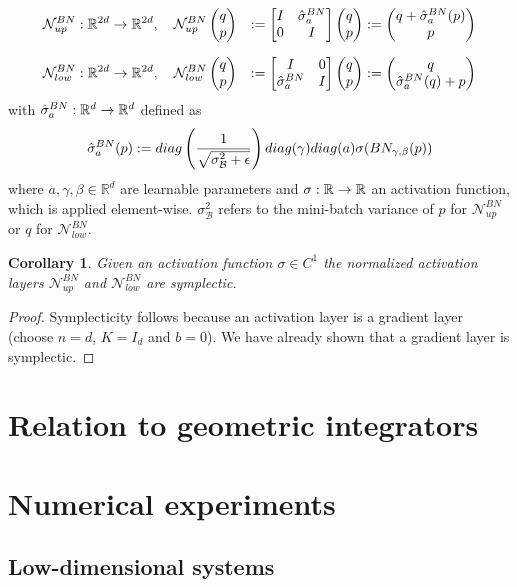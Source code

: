 \documentclass[twoside,a4paper]{article}
\newtheorem{corollary}{Corollary}
\begin{document}
\begin{alignat*}{2}
	\mathcal{N}^{BN}_{up} &: \mathbb{R}^{2d} \to \mathbb{R}^{2d}, \quad
	\mathcal{N}^{BN}_{up} \begin{pmatrix} q \\ p \end{pmatrix} &:= \begin{bmatrix} I & {\hat{\sigma}^{BN}_a} \\ 0 & I \end{bmatrix} \begin{pmatrix} q \\ p \end{pmatrix} := \begin{pmatrix}
		q + \hat{\sigma}^{BN}_a(p) \\
		p
	\end{pmatrix} \\[7pt]
	\mathcal{N}^{BN}_{low} &: \mathbb{R}^{2d} \to \mathbb{R}^{2d}, \quad
	\mathcal{N}^{BN}_{low} \begin{pmatrix} q \\ p \end{pmatrix} &:= \begin{bmatrix} I & 0 \\ {\hat{\sigma}^{BN}_a} & I \end{bmatrix} \begin{pmatrix} q \\ p \end{pmatrix} := \begin{pmatrix}
		q \\
		\hat{\sigma}^{BN}_a(q) + p
	\end{pmatrix}
\end{alignat*}
with $\hat{\sigma}^{BN}_a : \mathbb{R}^d \to \mathbb{R}^d$ defined as
\begin{equation*}
	\hat{\sigma}^{BN}_a(p) := 
	diag\left( \frac{1}{\sqrt{\sigma^2_\mathcal{B} + \epsilon}} \right) diag(\gamma)
	diag(a) \sigma(BN_{\gamma, \beta}(p))
\end{equation*}
where $a, \gamma, \beta \in \mathbb{R}^d$ are learnable parameters and 
$\sigma : \mathbb{R} \to \mathbb{R}$ an activation function,
which is applied element-wise. $\sigma^2_\mathcal{B}$ refers to the mini-batch variance of $p$
for $\mathcal{N}^{BN}_{up}$ or $q$ for $\mathcal{N}^{BN}_{low}$.

\begin{corollary}
	Given an activation function $\sigma \in C^1$
	the normalized activation layers $\mathcal{N}^{BN}_{up}$ and $\mathcal{N}^{BN}_{low}$
	are symplectic.
\end{corollary}
\begin{proof}
	Symplecticity follows because an activation layer is a gradient layer
	(choose $n=d$, $K=I_d$ and $b=0$). We have already shown that a gradient layer is symplectic.
\end{proof}

\section{Relation to geometric integrators}

\section{Numerical experiments}

\subsection{Low-dimensional systems}
\end{document}
